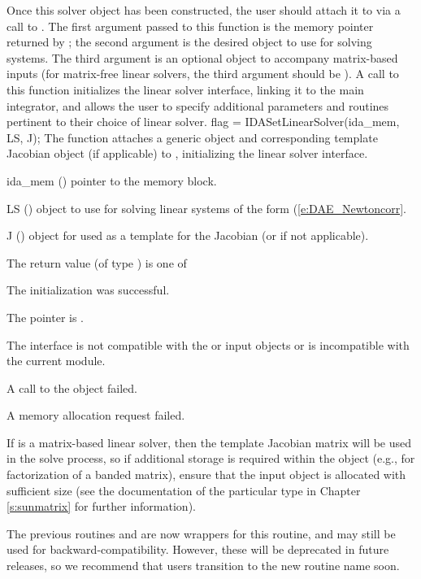 Once this solver object has been constructed, the user should attach
it to {\idas} via a call to .  The first argument 
passed to this function is the {\idas} memory pointer returned by
; the second argument is the desired {\sunlinsol} object
to use for solving systems.  The third argument is an optional
{\sunmatrix} object to accompany matrix-based {\sunlinsol} inputs (for
matrix-free linear solvers, the third argument should be ).
A call to this function initializes the {\idals} linear solver
interface, linking it to the main {\idas} integrator, and allows the
user to specify additional parameters and routines pertinent to their
choice of linear solver.
{
  flag = IDASetLinearSolver(ida\_mem, LS, J);
}
{
  The function  attaches a generic {\sunlinsol}
  object  and corresponding template Jacobian {\sunmatrix}
  object  (if applicable) to {\idas}, initializing the {\idals}
  linear solver interface. 
}
{
  \begin{args}
  \item[ida\_mem] ()
    pointer to the {\idas} memory block.
  \item[LS] ()
    {\sunlinsol} object to use for solving linear systems of the form
    (\ref{e:DAE_Newtoncorr}.
  \item[J] ()
    {\sunmatrix} object for used as a template for the Jacobian (or
     if not applicable).
  \end{args}
}
{
  The return value  (of type ) is one of
  \begin{args}
  \item[\Id{IDALS\_SUCCESS}]
    The {\idals} initialization was successful.
  \item[\Id{IDALS\_MEM\_NULL}]
    The  pointer is .
  \item[\Id{IDALS\_ILL\_INPUT}]
    The {\idals} interface is not compatible with the  or
     input objects or is incompatible with the current
    {\nvector} module.
  \item[\Id{IDALS\_SUNLS\_FAIL}]
    A call to the  object failed.
  \item[\Id{IDALS\_MEM\_FAIL}]
    A memory allocation request failed.
  \end{args}
}
{
  If  is a matrix-based linear solver, then the template
  Jacobian matrix  will be used in the solve process, so if
  additional storage is required within the {\sunmatrix} object
  (e.g., for factorization of a banded matrix), ensure that the input
  object is allocated with sufficient size (see the documentation of
  the particular {\sunmatrix} type in Chapter \ref{s:sunmatrix} for
  further information).

  The previous routines  and
   are now wrappers for this routine, and may
  still be used for backward-compatibility.  However, these will be
  deprecated in future releases, so we recommend that users transition
  to the new routine name soon.
}

